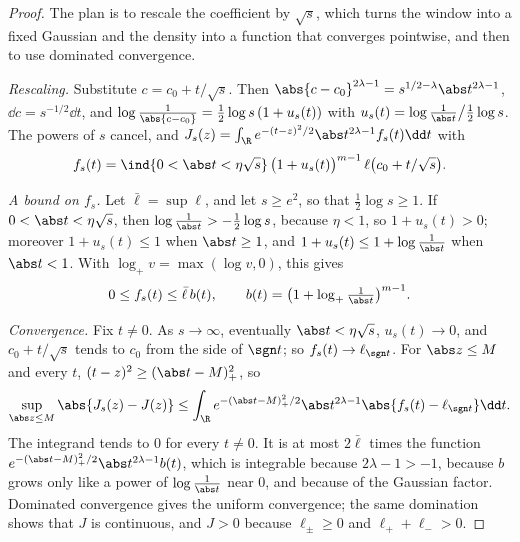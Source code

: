 \begin{refsection}

\begin{proof}
The plan is to rescale the coefficient by $\sqrt s$, which turns the window into a fixed Gaussian and the density into a function that converges pointwise, and then to use dominated convergence.

\emph{Rescaling.} Substitute $c=c_0+t/\sqrt s$. Then $\abs{c-c_0}^{2\lambda-1}=s^{1/2-\lambda}\abs t^{2\lambda-1}$, $\dd c=s^{-1/2}\dd t$, and $\log\frac1{\abs{c-c_0}}=\frac12\log s\,(1+u_s(t))$ with $u_s(t)=\log\frac1{\abs t}\big/\frac12\log s$. The powers of $s$ cancel, and $J_s(z)=\int_\R e^{-(t-z)^2/2}\abs t^{2\lambda-1}f_s(t)\dd t$ with
\[
f_s(t)=\ind\{0<\abs t<\eta\sqrt s\}\,\bigl(1+u_s(t)\bigr)^{m-1}\,\ell\bigl(c_0+t/\sqrt s\bigr).
\]

\emph{A bound on $f_s$.} Let $\bar\ell=\sup\ell$, and let $s\ge e^2$, so that $\frac12\log s\ge1$. If $0<\abs t<\eta\sqrt s$, then $\log\frac1{\abs t}>-\frac12\log s$, because $\eta<1$, so $1+u_s(t)>0$; moreover $1+u_s(t)\le1$ when $\abs t\ge1$, and $1+u_s(t)\le1+\log\frac1{\abs t}$ when $\abs t<1$. With $\log_+v=\max(\log v,0)$, this gives
\[
0\le f_s(t)\le\bar\ell\,b(t),\qquad b(t)=\bigl(1+\log_+\tfrac1{\abs t}\bigr)^{m-1}.
\]

\emph{Convergence.} Fix $t\ne0$. As $s\to\infty$, eventually $\abs t<\eta\sqrt s$, $u_s(t)\to0$, and $c_0+t/\sqrt s$ tends to $c_0$ from the side of $\sgn t$; so $f_s(t)\to\ell_{\sgn t}$. For $\abs z\le M$ and every $t$, $(t-z)^2\ge(\abs t-M)_+^2$, so
\[
\sup_{\abs z\le M}\abs{J_s(z)-J(z)}\le\int_\R e^{-(\abs t-M)_+^2/2}\abs t^{2\lambda-1}\abs{f_s(t)-\ell_{\sgn t}}\dd t.
\]
The integrand tends to $0$ for every $t\ne0$. It is at most $2\bar\ell$ times the function $e^{-(\abs t-M)_+^2/2}\abs t^{2\lambda-1}b(t)$, which is integrable because $2\lambda-1>-1$, because $b$ grows only like a power of $\log\frac1{\abs t}$ near $0$, and because of the Gaussian factor. Dominated convergence gives the uniform convergence; the same domination shows that $J$ is continuous, and $J>0$ because $\ell_\pm\ge0$ and $\ell_++\ell_->0$.


\end{proof}
\end{refsection}
